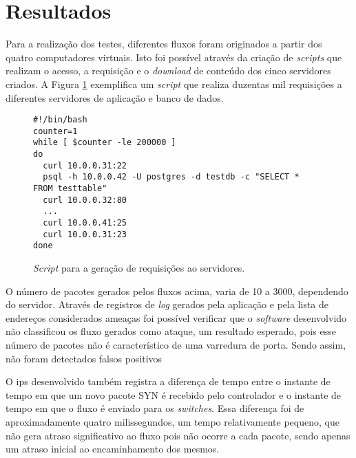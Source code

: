 \section{Resultados}

Para a realização dos testes, diferentes fluxos foram originados a partir dos quatro computadores virtuais. Isto foi possível através da criação de \textit{scripts} que realizam o acesso, a requisição e o \textit{download} de conteúdo dos cinco servidores criados. A Figura \ref{cod:scriptsgera} exemplifica um \textit{script} que realiza duzentas mil requisições a diferentes servidores de aplicação e banco de dados.

\FloatBarrier
\begin{figure}[H]
\centering
\caption{\textit{Script} para a geração de requisições ao servidores.}
\begin{lstlisting}[belowskip=-0.05 \baselineskip]
#!/bin/bash
counter=1
while [ $counter -le 200000 ]
do
  curl 10.0.0.31:22
  psql -h 10.0.0.42 -U postgres -d testdb -c "SELECT *  FROM testtable"
  curl 10.0.0.32:80
  ...
  curl 10.0.0.41:25
  curl 10.0.0.31:23
done
\end{lstlisting}
\label{cod:scriptsgera}
\end{figure}

O número de pacotes gerados pelos fluxos acima, varia de 10 a 3000, dependendo do servidor. Através de registros de \textit{log} gerados pela aplicação e pela lista de endereços considerados ameaças foi possível verificar que o \textit{software} desenvolvido não classificou os fluxo gerados como ataque, um resultado esperado, pois esse número de pacotes não é característico de uma varredura de porta. Sendo assim, não foram detectados falsos positivos

O \gls{ips} desenvolvido também registra a diferença de tempo entre o instante de tempo em que um novo pacote SYN é recebido pelo controlador e o instante de tempo em que o fluxo é enviado para os \textit{switches}. Essa diferença foi de aproximadamente quatro milissegundos, um tempo relativamente pequeno, que não gera atraso significativo ao fluxo pois não ocorre a cada pacote, sendo apenas um atraso inicial ao encaminhamento dos mesmos.


